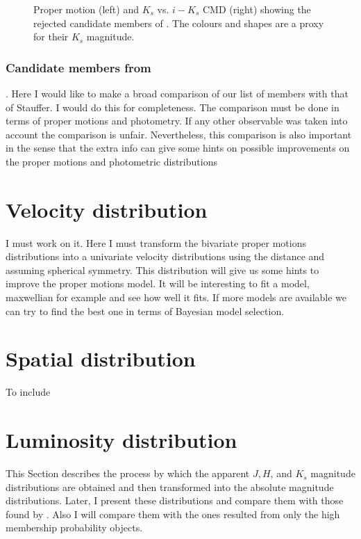 \begin{figure*}[htbp]
\begin{center}
\caption{Proper motion (left) and $K_s$ vs. $i-K_s$ CMD (right) showing the rejected candidate members of \citet{Bouy2015}. The colours and shapes are a proxy for their $K_s$ magnitude.}
\label{figure:rejectedsCOLORS}
\end{center}
\end{figure*}
\subsubsection{Candidate members from \citet{Stauffer2007}}.
Here I would like to make a broad comparison of our list of members with that of Stauffer. I would do this for completeness.
The comparison must be done in terms of proper motions and photometry. If any other observable was taken into account the comparison is unfair. Nevertheless, this comparison is also important in the sense that the extra info can give some hints on possible improvements on the proper motions and photometric distributions
\section{Velocity distribution}
I must work on it. Here I must transform the bivariate proper motions distributions into a univariate velocity distributions using the distance and assuming spherical symmetry. This distribution will give us some hints to improve the proper motions model. It will be interesting to fit a model, maxwellian for example and see how well it fits. If more models are available we can try to find the best one in terms of Bayesian model selection. 
\section{Spatial distribution}
To include
\section{Luminosity distribution}
This Section describes the process by which the apparent $J,H$, and $K_s$ magnitude distributions are obtained and then transformed into the absolute magnitude distributions. Later, I present  these distributions and compare them with those found by \citet{Bouy2015}. Also I will compare them with the ones resulted from only the high membership probability objects.

